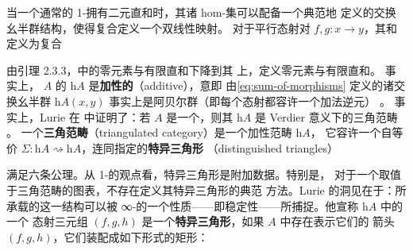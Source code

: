 \begin{digression}\label{dig:homotopy-category-stable}
当一个通常的 1-\trCategory{}拥有二元直和时，其诸 hom-集可以配备一个典范地
定义的交换幺半群结构，使得复合定义一个双线性映射。
对于平行态射对 $f,g\colon x\to y$，其和定义为复合
\begin{rveq}\label{eq:sum-of-morphisms}
\end{rveq}
由引理 2.3.3，\trStable{}\trInfinityCategory{}中的零元素与有限直和下降到其%
\trHomotopyCategory{}上，定义零元素与有限直和。
事实上，\trStable{}\trInfinityCategory{} $A$ 的\trHomotopyCategory{} $\mathrm{h}A$
是\textbf{加性的}（additive），意即
由\cref{eq:sum-of-morphisms} 定义的诸交换幺半群
$\mathrm{h}A(x,y)$ 事实上是阿贝尔群（即每个态射都容许一个加法逆元）
\cite[1.1.2.9]{bib80}。
事实上，Lurie 在 \cite[1.1.2.14]{bib80} 中证明了：若 $A$
是一个\trStable{}\trInfinityCategory{}，则其\trHomotopyCategory{} $\mathrm{h}A$
是 Verdier 意义下的三角范畴 \cite{bib127}。
一个\textbf{三角范畴}（triangulated category）是一个加性范畴 $\mathrm{h}A$，
它容许一个自等价
$\Sigma\colon\mathrm{h}A\rightsquigarrow\mathrm{h}A$，连同指定的\textbf{特异三角形}
（distinguished triangles）
\begin{center}
\end{center}
满足六条公理。从 1-\trCategory{}的观点看，特异三角形是附加数据。特别是，
对于一个取值于三角范畴的图表\trCategory{}，不存在定义其特异三角形的典范
方法。Lurie 的洞见在于：\trHomotopyCategory{}所承载的这一结构可以被%
∞-\trCategory{}的一个性质——即稳定性——所捕捉。他宣称 $\mathrm{h}A$ 中的一个
态射三元组 $(f,g,h)$ 是一个\textbf{特异三角形}，如果 $A$ 中存在表示它们的
箭头 $(f,g,h)$，它们装配成如下形式的\trPushout{}矩形：

\end{digression}

